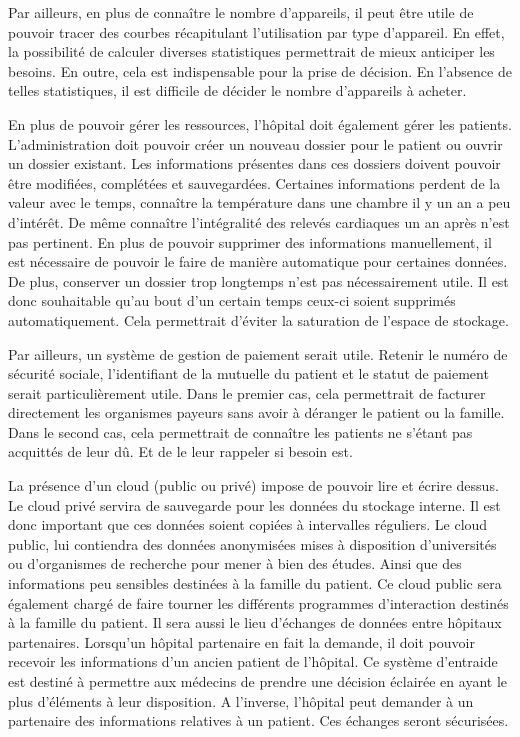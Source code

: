 Par ailleurs, en plus de connaître le nombre d'appareils, il peut être utile de pouvoir tracer des courbes récapitulant
l'utilisation par type d'appareil. En effet, la possibilité de calculer diverses statistiques permettrait de mieux anticiper les
besoins. En outre, cela est indispensable pour la prise de décision. En l'absence de telles statistiques, il est difficile de
décider le nombre d'appareils à acheter.  
\newline

En plus de pouvoir gérer les ressources, l'hôpital doit également gérer les patients. L'administration doit pouvoir créer un
nouveau dossier pour le patient ou ouvrir un dossier existant. Les informations présentes dans ces dossiers doivent pouvoir être
modifiées, complétées et sauvegardées. Certaines informations perdent de la valeur avec le temps, connaître la température dans
une chambre il y un an a peu d'intérêt. De même connaître l'intégralité des relevés cardiaques un an après n'est pas pertinent. En
plus de pouvoir supprimer des informations manuellement, il est nécessaire de pouvoir le faire de manière automatique pour
certaines données. De plus, conserver un dossier trop longtemps n'est pas nécessairement utile. Il est donc souhaitable qu'au
bout d'un certain temps ceux-ci soient supprimés automatiquement. Cela permettrait d'éviter la saturation de l'espace de stockage.
\newline

Par ailleurs, un système de gestion de paiement serait utile. Retenir le numéro de sécurité sociale, l'identifiant de la mutuelle
du patient et le statut de paiement serait particulièrement utile. Dans le premier cas, cela permettrait de facturer directement
les organismes payeurs sans avoir à déranger le patient ou la famille. Dans le second cas, cela permettrait de connaître les
patients ne s'étant pas acquittés de leur dû. Et de le leur rappeler si besoin est.
\newline

La présence d'un cloud (public ou privé) impose de pouvoir lire et écrire dessus. Le cloud privé servira de sauvegarde pour les
données du stockage interne. Il est donc important que ces données soient copiées à intervalles réguliers. Le cloud public, lui
contiendra des données anonymisées mises à disposition d'universités ou d'organismes de recherche pour mener à bien des études.
Ainsi que des informations peu sensibles destinées à la famille du patient. Ce cloud public sera également chargé de faire tourner
les différents programmes d'interaction destinés à la famille du patient. Il sera aussi le lieu d'échanges de données entre
hôpitaux partenaires. Lorsqu'un hôpital partenaire en fait la demande, il doit pouvoir recevoir les informations d'un ancien patient
de l'hôpital. Ce système d'entraide est destiné à permettre aux médecins de prendre une décision éclairée en ayant le plus
d'éléments à leur disposition. A l'inverse, l'hôpital peut demander à un partenaire des informations relatives à un patient. Ces
échanges seront sécurisées.
\newline

